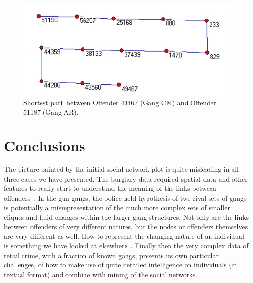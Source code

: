 \documentclass[conference]{IEEEtran}
\theoremstyle{definition}
\begin{document}
\begin{figure}[!ht] 
\centering
\includegraphics[width=\columnwidth]{images/path1}
\caption{Shortest path between Offender 49467 (Gang CM) and Offender 51187 (Gang AR).}
\label{fig:path1}
\end{figure}


\section{Conclusions}\label{sec:discussion}
The picture painted by the initial social network plot is quite
misleading in all three cases we have presented. The burglary data
required spatial data and other features to really start to understand
the meaning of the links between
offenders~\cite{JohnsonBowers2004,EwartOatley2005}. In the gun gangs,
the police held hypothesis of two rival sets of gangs is potentially a
misrepresentation of the much more complex sets of smaller cliques and
fluid changes within the larger gang structures. Not only are the
links between offenders of very different natures, but the nodes or
offenders themselves are very different as well. How to represent the
changing nature of an individual is something we have looked at
elsewhere~\cite{oatley+crick_asonam2014}. Finally then the very complex data of retail crime, with a
fraction of known gangs, presents its own particular challenges, of
how to make use of quite detailed intelligence on individuals (in
textual format) and combine with mining of the social networks.




\end{document}
